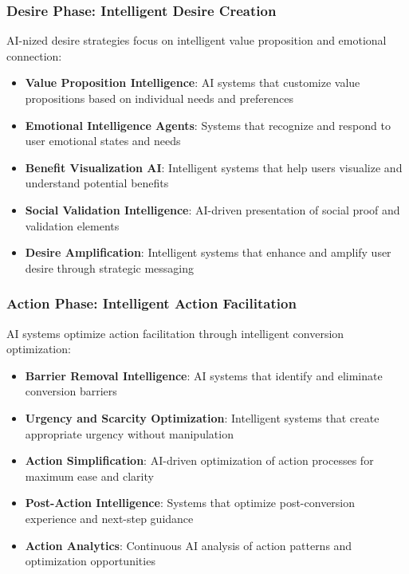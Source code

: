 \subsubsection{Desire Phase: Intelligent Desire Creation}

AI-nized desire strategies focus on intelligent value proposition and emotional connection:

\begin{itemize}
    \item \textbf{Value Proposition Intelligence}: AI systems that customize value propositions based on individual needs and preferences
    \item \textbf{Emotional Intelligence Agents}: Systems that recognize and respond to user emotional states and needs
    \item \textbf{Benefit Visualization AI}: Intelligent systems that help users visualize and understand potential benefits
    \item \textbf{Social Validation Intelligence}: AI-driven presentation of social proof and validation elements
    \item \textbf{Desire Amplification}: Intelligent systems that enhance and amplify user desire through strategic messaging
\end{itemize}

\subsubsection{Action Phase: Intelligent Action Facilitation}

AI systems optimize action facilitation through intelligent conversion optimization:

\begin{itemize}
    \item \textbf{Barrier Removal Intelligence}: AI systems that identify and eliminate conversion barriers
    \item \textbf{Urgency and Scarcity Optimization}: Intelligent systems that create appropriate urgency without manipulation
    \item \textbf{Action Simplification}: AI-driven optimization of action processes for maximum ease and clarity
    \item \textbf{Post-Action Intelligence}: Systems that optimize post-conversion experience and next-step guidance
    \item \textbf{Action Analytics}: Continuous AI analysis of action patterns and optimization opportunities
\end{itemize}

